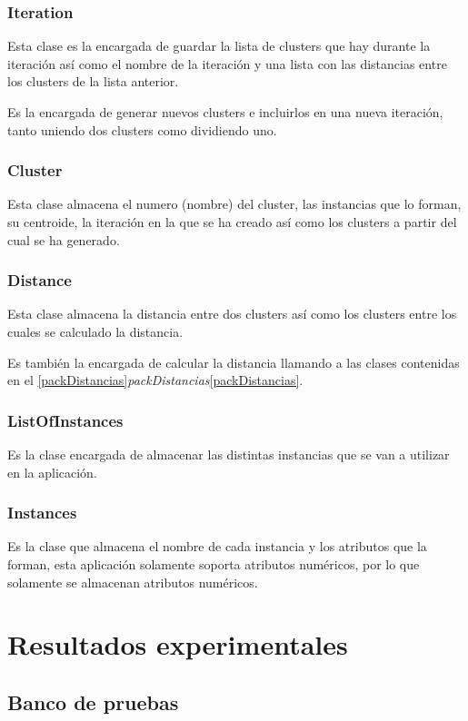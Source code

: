 \documentclass[11pt, titlepage,a4paper]{article}
\begin{document}
\subsubsection{Iteration}
Esta clase es la encargada de guardar la lista de clusters que hay durante la
iteración así como el nombre de la iteración y una lista con las distancias
entre los clusters de la lista anterior.

Es la encargada de generar nuevos clusters e incluirlos en una nueva iteración,
tanto uniendo dos clusters como dividiendo uno.

\subsubsection{Cluster}
Esta clase almacena el numero (nombre) del cluster, las instancias que lo forman,
su centroide, la iteración en la que se ha creado así como los clusters a partir
del cual se ha generado.

\subsubsection{Distance}
Esta clase almacena la distancia entre dos clusters así como los clusters entre
los cuales se calculado la distancia.

Es también la encargada de calcular la distancia llamando a las clases
contenidas en el
\ref{packDistancias}\textit{packDistancias}\ref{packDistancias}.

\subsubsection{ListOfInstances}
Es la clase encargada de almacenar las distintas instancias que se van a
utilizar en la aplicación.

\subsubsection{Instances}
Es la clase que almacena el nombre de cada instancia y los atributos que la
forman, esta aplicación solamente soporta atributos numéricos, por lo que
solamente se almacenan atributos numéricos.


\section{Resultados experimentales}

\subsection{Banco de pruebas}
\end{document}
